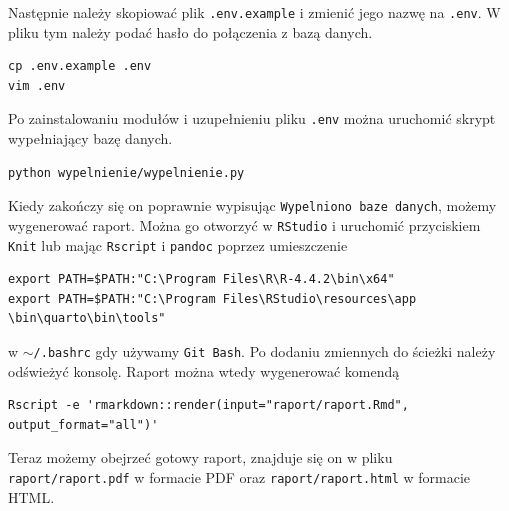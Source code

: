 \documentclass[a4paper,12pt]{mwart}
\begin{document}
Następnie należy skopiować plik \texttt{.env.example} i zmienić jego nazwę na \texttt{.env}. W pliku tym należy podać hasło do połączenia z bazą danych.

\begin{verbatim}
cp .env.example .env
vim .env
\end{verbatim}

Po zainstalowaniu modułów i uzupełnieniu pliku \texttt{.env} można uruchomić skrypt wypełniający bazę danych.

\begin{verbatim}
python wypelnienie/wypelnienie.py
\end{verbatim}

Kiedy zakończy się on poprawnie wypisując \texttt{Wypelniono baze danych}, możemy wygenerować raport. Można go otworzyć w \texttt{RStudio} i uruchomić przyciskiem \texttt{Knit} lub mając \texttt{Rscript} i \texttt{pandoc} poprzez umieszczenie 

\begin{verbatim}
export PATH=$PATH:"C:\Program Files\R\R-4.4.2\bin\x64"
export PATH=$PATH:"C:\Program Files\RStudio\resources\app
\bin\quarto\bin\tools"
\end{verbatim}

\noindent w \texttt{$\sim$/.bashrc} gdy używamy \texttt{Git Bash}. Po dodaniu zmiennych do ścieżki należy odświeżyć konsolę. Raport można wtedy wygenerować komendą

\begin{verbatim}
Rscript -e 'rmarkdown::render(input="raport/raport.Rmd", output_format="all")'
\end{verbatim}

Teraz możemy obejrzeć gotowy raport, znajduje się on w pliku \newline \texttt{raport/raport.pdf} w formacie PDF oraz \texttt{raport/raport.html} w formacie HTML.
\end{document}
